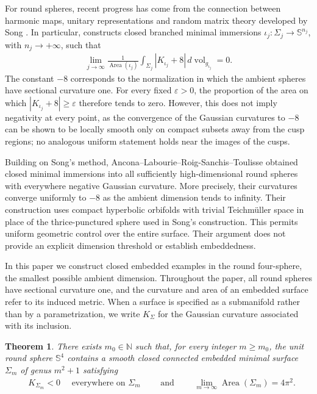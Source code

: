 \documentclass[a4paper,11pt,oneside,reqno]{amsart}
\numberwithin{equation}{section}
\newtheorem{theorem}{Theorem}[section]
\theoremstyle{definition}
\begin{document}
For round spheres, recent progress has come from the connection
between harmonic maps, unitary representations and random
matrix theory developed by Song
\cite{SongRandomHarmonicMaps}.
In particular, \cite[Theorem~0.3]{SongRandomHarmonicMaps}
constructs closed branched minimal immersions
$\iota_j:\Sigma_j\to\mathbb{S}^{n_j}$, with
$n_j\to+\infty$, such that
%
\begin{align*}
    \lim_{j\to\infty}
    \frac{1}{\operatorname{Area}(\iota_j)}
    \int_{\Sigma_j}
    |K_{\iota_j}+8|\,
    d\operatorname{vol}_{g_{\iota_j}}=0.
\end{align*}
%
The constant $-8$ corresponds to the normalization in which
the ambient spheres have sectional curvature one.
For every fixed $\varepsilon>0$, the proportion of the area
on which $|K_{\iota_j}+8|\geq\varepsilon$ therefore tends
to zero. However, this does not imply negativity at every point, as the convergence of the Gaussian curvatures to $-8$ can be shown to be locally smooth only on compact subsets away from the cusp regions; no analogous uniform statement holds near the images of the cusps. 

Building on Song's method,
Ancona--Labourie--Roig-Sanchis--Toulisse
\cite{AnconaLabourieRoigSanchisToulisse}
obtained closed minimal immersions into all sufficiently
high-dimensional round spheres with everywhere negative
Gaussian curvature. More precisely, their curvatures
converge uniformly to $-8$ as the ambient dimension tends
to infinity. Their construction uses compact
hyperbolic orbifolds with trivial Teichm\"uller space in place of
the thrice-punctured sphere used in Song's construction.
This permits uniform geometric control over the entire
surface. Their argument does not provide an explicit
dimension threshold or establish embeddedness.

In this paper we construct closed embedded examples in
the round four-sphere, the smallest possible ambient
dimension.
Throughout the paper, all round spheres have sectional
curvature one, and the curvature and area of an embedded
surface refer to its induced metric. When a surface is
specified as a submanifold rather than by a parametrization,
we write $K_\Sigma$ for the Gaussian curvature associated
with its inclusion.


\begin{theorem}
    \label{thm:s4-main}
    There exists $m_0\in\mathbb{N}$ such that, for every integer $m\geq m_0$, the unit round sphere $\mathbb{S}^4$ contains a smooth closed connected embedded minimal surface $\Sigma_m$ of genus $m^2+1$ satisfying
    \begin{align*}
        &K_{\Sigma_m}<0 \quad\text{ everywhere on }\Sigma_m \qquad\mbox{ and }\qquad \lim_{m\to\infty}\operatorname{Area}(\Sigma_m)=4\pi^2.
    \end{align*}
\end{theorem}
\end{document}
